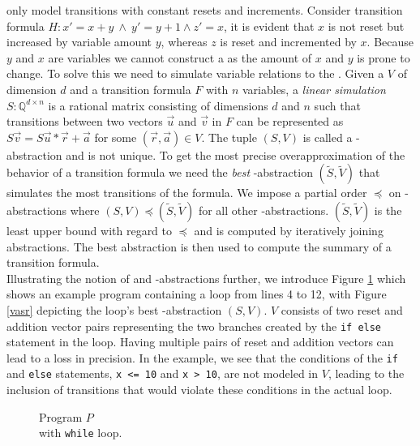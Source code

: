\qvasr only model transitions with constant resets and increments. Consider transition formula $H: x' = x + y\ \land\ y' = y + 1 \land z' = x$, it is evident that $x$ is not reset but increased by variable amount $y$, whereas $z$ is reset and incremented by $x$. Because $y$ and $x$ are variables we cannot construct a \qvasr as the amount of $x$ and $y$ is prone to change. To solve this we need to simulate variable relations to the \qvasr. Given a \qvasr $V$ of dimension $d$ and a transition formula $F$ with $n$ variables, a \textsl{linear simulation} $S: \mathbb{Q}^{d \times n} $ is a rational matrix consisting of dimensions $d$ and $n$ such that transitions between two vectors $\vec{u}$ and $\vec{v}$ in $F$ can be represented as $S\vec{v} = S\vec{u} * \vec{r} + \vec{a}$ for some $(\vec{r}, \vec{a}) \in V$. The tuple $(S, V)$ is called a \qvasr-abstraction and is not unique. To get the most precise overapproximation of the behavior of a transition formula we need the \textsl{best} \qvasr-abstraction $(\tilde{S}, \tilde{V})$ that simulates the most transitions of the formula. We impose a partial order $\preceq$ on \qvasr-abstractions where $(S, V) \preceq (\tilde{S}, \tilde{V})$ for all other \qvasr-abstractions. $(\tilde{S}, \tilde{V})$ is the least upper bound with regard to $\preceq$ and is computed by iteratively joining abstractions. The best abstraction is then used to compute the summary of a transition formula. \\ Illustrating the notion of \qvasr and \qvasr-abstractions further, we introduce Figure \ref{code} which shows an example program containing a loop from lines 4 to 12, with Figure \ref{vasr} depicting the loop's best \qvasr-abstraction $(S,V)$. $V$ consists of two reset and addition vector pairs representing the two branches created by the \texttt{if else} statement in the loop. Having multiple pairs of reset and addition vectors can lead to a loss in precision. In the example, we see that the conditions of the \texttt{if} and \texttt{else} statements, \texttt{x <= 10} and \texttt{x > 10}, are not modeled in $V$, leading to the inclusion of transitions that would violate these conditions in the actual loop. \\
\begin{minipage}[t]{0.3\linewidth} \centering
	\begin{figure}[H]
		
		\caption{Program $P$ \\ with \texttt{while} loop.}
		\label{code}
	\end{figure}
\end{minipage}
